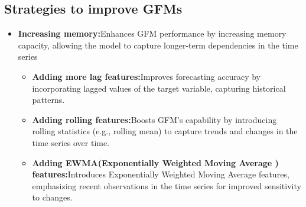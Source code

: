 \documentclass{article}
\begin{document}
\subsection{Strategies to improve GFMs}
\begin{itemize}
    \item \textbf{Increasing memory:}Enhances GFM performance by increasing memory capacity, allowing the model to capture longer-term dependencies in the time series
    \begin{itemize}
    \item \textbf{Adding more lag features:}Improves forecasting accuracy by incorporating lagged values of the target variable, capturing historical patterns.
    \item \textbf{Adding rolling features:}Boosts GFM's capability by introducing rolling statistics (e.g., rolling mean) to capture trends and changes in the time series over time.
    \item \textbf{Adding EWMA(Exponentially Weighted Moving Average ) features:}Introduces Exponentially Weighted Moving Average features, emphasizing recent observations in the time series for improved sensitivity to changes.
    \end{itemize}
    

\end{itemize}
\end{document}

